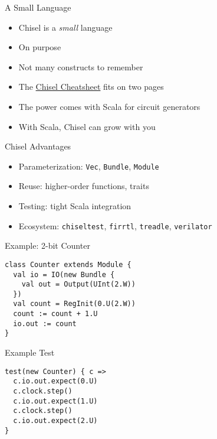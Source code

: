 

\begin{frame}[fragile]{A Small Language}
\begin{itemize}
\item Chisel is a \emph{small} language
\item On purpose
\item Not many constructs to remember
\item The \href{https://github.com/freechipsproject/chisel-cheatsheet/releases/latest/download/chisel_cheatsheet.pdf}{Chisel Cheatsheet} fits on two pages
\item The power comes with Scala for circuit generators
\item With Scala, Chisel can grow with you
\end{itemize}
\end{frame}

\begin{frame}{Chisel Advantages}
\begin{itemize}
    \item Parameterization: \texttt{Vec}, \texttt{Bundle}, \texttt{Module}
    \item Reuse: higher-order functions, traits
    \item Testing: tight Scala integration
    \item Ecosystem: \texttt{chiseltest}, \texttt{firrtl}, \texttt{treadle}, \texttt{verilator}
\end{itemize}
\end{frame}


\begin{frame}[fragile]{Example: 2-bit Counter}
\begin{verbatim}
class Counter extends Module {
  val io = IO(new Bundle {
    val out = Output(UInt(2.W))
  })
  val count = RegInit(0.U(2.W))
  count := count + 1.U
  io.out := count
}
\end{verbatim}
\end{frame}

\begin{frame}[fragile]{Example Test}
\begin{verbatim}
test(new Counter) { c =>
  c.io.out.expect(0.U)
  c.clock.step()
  c.io.out.expect(1.U)
  c.clock.step()
  c.io.out.expect(2.U)
}
\end{verbatim}
\end{frame}



